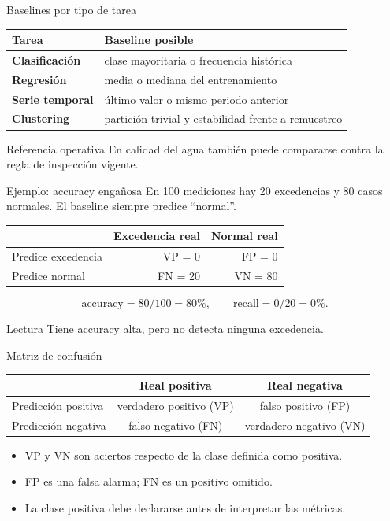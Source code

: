 \documentclass[aspectratio=169,10pt]{beamer}
\begin{document}
\begin{frame}{Baselines por tipo de tarea}
  \small
  \begin{tabularx}{\textwidth}{>{\bfseries}p{} X}
    \toprule Tarea & Baseline posible \\ \midrule
    Clasificación & clase mayoritaria o frecuencia histórica \\
    Regresión & media o mediana del entrenamiento \\
    Serie temporal & último valor o mismo periodo anterior \\
    Clustering & partición trivial y estabilidad frente a remuestreo \\
    \bottomrule
  \end{tabularx}
  \begin{block}{Referencia operativa}
    En calidad del agua también puede compararse contra la regla de inspección vigente.
  \end{block}
\end{frame}

\begin{frame}{Ejemplo: accuracy engañosa}
  \footnotesize
  En 100 mediciones hay 20 excedencias y 80 casos normales. El baseline siempre predice ``normal''.
  \begin{center}
  \begin{tabular}{lrr}
    \toprule & Excedencia real & Normal real \\ \midrule
    Predice excedencia & VP = 0 & FP = 0 \\
    Predice normal & FN = 20 & VN = 80 \\
    \bottomrule
  \end{tabular}
  \end{center}
  \[
    \mathrm{accuracy}=80/100=80\%,\qquad \mathrm{recall}=0/20=0\%.
  \]
  \begin{alertblock}{Lectura}
    Tiene accuracy alta, pero no detecta ninguna excedencia.
  \end{alertblock}
\end{frame}

\begin{frame}{Matriz de confusión}
  \small
  \begin{center}
  \begin{tabular}{lcc}
    \toprule & Real positiva & Real negativa \\ \midrule
    Predicción positiva & verdadero positivo (VP) & falso positivo (FP) \\
    Predicción negativa & falso negativo (FN) & verdadero negativo (VN) \\
    \bottomrule
  \end{tabular}
  \end{center}
  \begin{itemize}
    \item VP y VN son aciertos respecto de la clase definida como positiva.
    \item FP es una falsa alarma; FN es un positivo omitido.
    \item La clase positiva debe declararse antes de interpretar las métricas.
  \end{itemize}
\end{frame}
\end{document}
